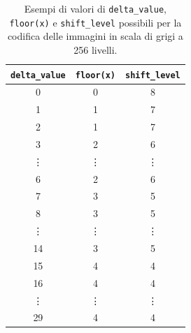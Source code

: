 \documentclass{article}
\begin{document}
\begin{itemize}
          \vspace{0,2cm}
          \begin{table}[h]
              \centering
              \small
              \def\arraystretch{1.2} %
              \caption{Esempi di valori di \texttt{delta\_value}, \texttt{floor(x)} e \texttt{shift\_level} possibili per la codifica delle immagini in scala di grigi a 256 livelli.}
              \begin{tabular}{||c|c|c||}
                  \hline
                  \texttt{delta\_value} & \texttt{floor(x)\footnotemark} & \texttt{shift\_level} \\
                  \hline \hline
                  0                     & 0                              & 8                     \\\hline
                  1                     & 1                              & 7                     \\\hline
                  2                     & 1                              & 7                     \\\hline
                  3                     & 2                              & 6                     \\\hline
                  \vdots                & \vdots                         & \vdots                \\\hline
                  6                     & 2                              & 6                     \\\hline
                  7                     & 3                              & 5                     \\\hline
                  8                     & 3                              & 5                     \\\hline
                  \vdots                & \vdots                         & \vdots                \\\hline
                  14                    & 3                              & 5                     \\\hline
                  15                    & 4                              & 4                     \\\hline
                  16                    & 4                              & 4                     \\\hline
                  \vdots                & \vdots                         & \vdots                \\\hline
                  29                    & 4                              & 4                     \\\hline

\end{tabular}
\end{table}
\end{itemize}
\end{document}

